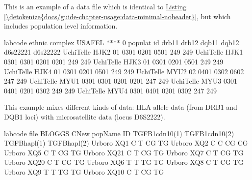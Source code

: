 \documentclass[letterpaper,10pt,english,openany,oneside]{sphinxmanual}
\begin{document}
\sphinxAtStartPar
This is an example of a data file which is identical to
\hyperref[\detokenize{docs/guide-chapter-usage:data-minimal-noheader}]{Listing \ref{\detokenize{docs/guide-chapter-usage:data-minimal-noheader}}}, but which includes population level
information.
\def\sphinxLiteralBlockLabel{\label{\detokenize{docs/guide-chapter-usage:data-hla-microsat}}}
\begin{sphinxVerbatim}[commandchars=\\\{\}]
labcode ethnic  complex
USAFEL  ****    0
populat    id      drb1\PYGZus{}1  drb1\PYGZus{}2  dqb1\PYGZus{}1  dqb1\PYGZus{}2  d6s2222\PYGZus{}1  d6s2222\PYGZus{}2
UchiTelle  HJK\PYGZus{}2   01      0301    0201     0501    249        249
UchiTelle  HJK\PYGZus{}1   0301    0301    0201     0201    249        249
UchiTelle  HJK\PYGZus{}3   01      0301    0201     0501    249        249
UchiTelle  HJK\PYGZus{}4   01      0301    0201     0501    249        249
UchiTelle  MYU\PYGZus{}2   02      0401    0302     0602    247        249
UchiTelle  MYU\PYGZus{}1   0301    0301    0201     0201    247        249
UchiTelle  MYU\PYGZus{}3   0301    0401    0201     0302    249        249
UchiTelle  MYU\PYGZus{}4   0301    0401    0201     0302    247        249
\end{sphinxVerbatim}

\sphinxAtStartPar
This example mixes different kinds of data: HLA allele data (from DRB1
and DQB1 loci) with microsatellite data (locus D6S2222).
\def\sphinxLiteralBlockLabel{\label{\detokenize{docs/guide-chapter-usage:data-nucleotide}}}
\begin{sphinxVerbatim}[commandchars=\\\{\}]
labcode file
BLOGGS  C\PYGZus{}New
popName ID       TGFB1cdn10(1) TGFB1cdn10(2) TGFBhapl(1) TGFBhapl(2)
Urboro  XQ\PYGZhy{}1     C             T             CG          TG
Urboro  XQ\PYGZhy{}2     C             C             CG          CG
Urboro  XQ\PYGZhy{}5     C             T             CG          TG
Urboro  XQ\PYGZhy{}21    C             T             CG          TG
Urboro  XQ\PYGZhy{}7     C             T             CG          TG
Urboro  XQ\PYGZhy{}20    C             T             CG          TG
Urboro  XQ\PYGZhy{}6     T             T             TG          TG
Urboro  XQ\PYGZhy{}8     C             T             CG          TG
Urboro  XQ\PYGZhy{}9     T             T             TG          TG
Urboro  XQ\PYGZhy{}10    C             T             CG          TG
\end{sphinxVerbatim}
\end{document}
